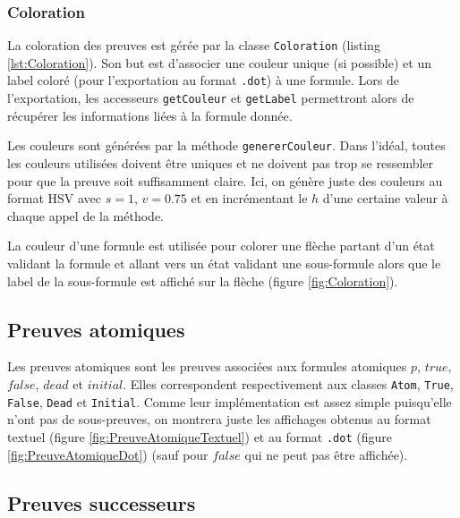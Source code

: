 \documentclass[dvipsnames]{report}
\begin{document}


\subsubsection{Coloration}

La coloration des preuves est gérée par la classe \texttt{Coloration} (listing \ref{lst:Coloration}). Son but est d'associer une couleur unique (si possible) et un label coloré (pour l'exportation au format \texttt{.dot}) à une formule. Lors de l'exportation, les accesseurs \texttt{getCouleur} et \texttt{getLabel} permettront alors de récupérer les informations liées à la formule donnée.

Les couleurs sont générées par la méthode \texttt{genererCouleur}. Dans l'idéal, toutes les couleurs utilisées doivent être uniques et ne doivent pas trop se ressembler pour que la preuve soit suffisamment claire. Ici, on génère juste des couleurs au format HSV avec $s=1$, $v=0.75$ et en incrémentant le $h$ d'une certaine valeur à chaque appel de la méthode.

La couleur d'une formule est utilisée pour colorer une flèche partant d'un état validant la formule et allant vers un état validant une sous-formule alors que le label de la sous-formule est affiché sur la flèche (figure \ref{fig:Coloration}).



\subsection{Preuves atomiques}

Les preuves atomiques sont les preuves associées aux formules atomiques $p$, $true$, $false$, $dead$ et $initial$. Elles correspondent respectivement aux classes \texttt{Atom}, \texttt{True}, \texttt{False}, \texttt{Dead} et \texttt{Initial}. Comme leur implémentation est assez simple puisqu'elle n'ont pas de sous-preuves, on montrera juste les affichages obtenus au format textuel (figure \ref{fig:PreuveAtomiqueTextuel}) et au format \texttt{.dot} (figure \ref{fig:PreuveAtomiqueDot}) (sauf pour $false$ qui ne peut pas être affichée).





\subsection{Preuves successeurs}
\end{document}
